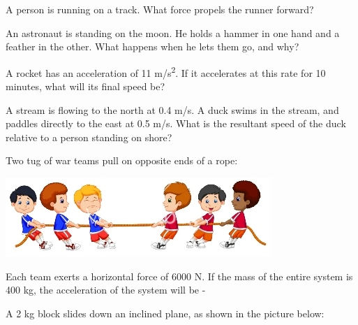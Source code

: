 \documentclass[10pt]{examdesign}
\begin{document}
\begin{multiplechoice} [title={Multiple Choice},
	rearrange=yes]
\begin{question}
\end{question}


\begin{question}
	A person is running on a track. What force propels the runner forward? 

\end{question}

\begin{question}
	An astronaut is standing on the moon.  He holds a hammer in one hand and a feather in the other.  What happens when he lets them go, and why?

\end{question}


\begin{question}
	A rocket has an acceleration of 11 m/s\textsuperscript{2}.  If it accelerates at this rate for 10 minutes, what will its final speed be?

\end{question}

\begin{question}A stream is flowing to the north at 0.4 m/s.  A duck swims in the stream, and paddles directly to the east at 0.5 m/s. What is the resultant speed of the duck relative to a person standing on shore?  

\end{question}

\begin{question}
	Two tug of war teams pull on opposite ends of a rope:
	
	\begin{center}
			\includegraphics[height={.5in}]{tug.png}
	\end{center}

	
	 Each team exerts a horizontal force of 6000 N.  If the mass of the entire system is 400 kg, the acceleration of the system will be - 

\end{question}


\begin{question}
	
	A 2 kg block slides down an inclined plane, as shown in the picture below:  
	

\end{question}
\end{multiplechoice}
\end{document}
